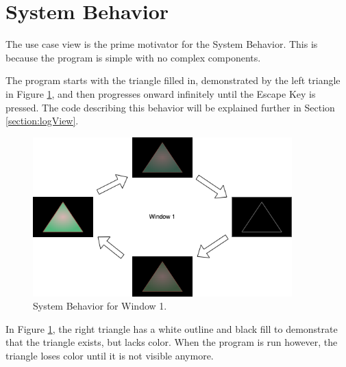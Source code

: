 \section{System Behavior}
\label{section:sysBehavior}

The use case view is the prime motivator for the System Behavior.
This is because the program is simple with no complex components.

The program starts with the triangle filled in, demonstrated by the left triangle in Figure \ref{Fig:Fig1}, and then progresses onward infinitely until the Escape Key is pressed.
The code describing this behavior will be explained further in Section \ref{section:logView}.

\begin{figure}[htb]
    \centering
    \includegraphics[width=10cm]{./Images/SysBehavior.png}
       \caption{System Behavior for Window 1.}
           \label{Fig:Fig1}
\end{figure}

In Figure \ref{Fig:Fig1}, the right triangle has a white outline and black fill to demonstrate that the triangle exists, but lacks color.
When the program is run however, the triangle loses color until it is not visible anymore.